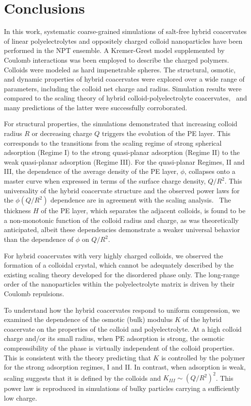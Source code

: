 \documentclass[journal=mamobx, manuscript=article]{achemso}
\begin{document}
\section{Conclusions}
\label{section:conclusion}

In this work, systematic coarse-grained simulations of salt-free hybrid coacervates of linear polyelectrolytes and oppositely charged colloid nanoparticles have been performed in the NPT ensemble. A Kremer-Grest model supplemented by Coulomb interactions was been employed to describe the charged polymers. Colloids were modeled as hard impenetrable spheres. The structural, osmotic, and dynamic properties of hybrid coacervates were explored over a wide range of parameters, including the colloid net charge and radius. Simulation results were compared to the scaling theory of hybrid colloid-polyelectrolyte coacervates,~\cite{artem2022hybrid} and many predictions of the latter were successfully corroborated.     

For structural properties, the simulations demonstrated that increasing colloid radius $R$ or decreasing charge $Q$ triggers the evolution of the PE layer. This corresponds to the transitions from the scaling regime of strong spherical adsorption (Regime I) to the strong quasi-planar adsorption (Regime II) to the weak quasi-planar adsorption (Regime III). For the quasi-planar Regimes, II and III, the dependence of the average density of the PE layer, $\phi$, collapses onto a master curve when expressed in terms of the surface charge density, $Q/R^2$. This universality of the hybrid coacervate structure and the observed power laws for the $\phi (Q/R^2)$ dependence are in agreement with the scaling analysis.~\cite{artem2022hybrid} The thickness $H$ of the PE layer,  which separates the adjacent colloids, is found to be a non-monotonic function of the colloid radius and charge, as was theoretically anticipated, albeit these dependencies demonstrate a weaker universal behavior than the dependence of $\phi$ on $Q/R^2$.

For hybrid coacervates with very highly charged colloids, we observed the formation of a colloidal crystal, which cannot be adequately described by the existing scaling theory developed for the disordered phase only. The long-range order of the nanoparticles within the polyelectrolyte matrix is driven by their Coulomb repulsions.

To understand how the hybrid coacervates respond to uniform compression, we examined the dependence of the osmotic (bulk) modulus $K$ of the hybrid coacervate on the properties of the colloid and polyelectrolyte. At a high colloid charge and/or its small radius, when PE adsorption is strong, the osmotic compressibility of the phase is virtually independent of the colloid properties. This is consistent with the theory predicting that $K$ is controlled by the polymer for the strong adsorption regimes, I and II. In contrast, when adsorption is weak, scaling suggests that it is defined by the colloids and $K_{III} \sim (Q / R^2)^2$. This power law is reproduced in simulations of bulky particles carrying a sufficiently low charge.  
\end{document}
